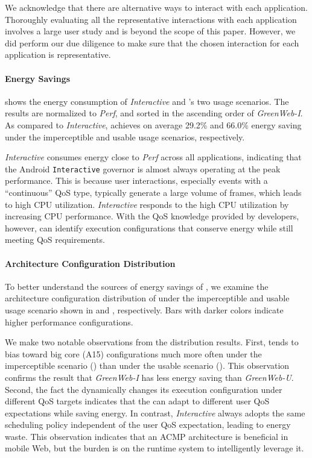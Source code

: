 We acknowledge that there are alternative ways to interact with each application. Thoroughly evaluating all the representative interactions with each application involves a large user study and is beyond the scope of this paper. However, we did perform our due diligence to make sure that the chosen interaction for each application is representative.

\paragraph{Energy Savings}  shows the energy consumption of \textit{Interactive} and \greenweb's two usage scenarios. The results are normalized to \textit{Perf}, and sorted in the ascending order of \textit{GreenWeb-I}. As compared to \textit{Interactive}, \greenweb achieves on average 29.2\% and 66.0\% energy saving under the imperceptible and usable usage scenarios, respectively.

\textit{Interactive} consumes energy close to \textit{Perf} across all applications, indicating that the Android \texttt{Interactive} governor is almost always operating at the peak performance. This is because user interactions, especially events with a ``continuous'' QoS type, typically generate a large volume of frames, which leads to high CPU utilization. \textit{Interactive} responds to the high CPU utilization by increasing CPU performance. With the QoS knowledge provided by developers, however, \greenweb can identify execution configurations that conserve energy while still meeting QoS requirements.

\paragraph{Architecture Configuration Distribution} To better understand the sources of energy savings of \greenweb, we examine the architecture configuration distribution of \greenweb under the imperceptible and usable usage scenario shown in  and , respectively. Bars with darker colors indicate higher performance configurations.

We make two notable observations from the distribution results. First, \greenweb tends to bias toward big core (A15) configurations much more often under the imperceptible scenario () than under the usable scenario (). This observation confirms the result that \textit{GreenWeb-I} has less energy saving than \textit{GreenWeb-U}. Second, the fact the \greenweb dynamically changes its execution configuration under different QoS targets indicates that the \greenweb can adapt to different user QoS expectations while saving energy. In contrast, \textit{Interactive} always adopts the same scheduling policy independent of the user QoS expectation, leading to energy waste. This observation indicates that an ACMP architecture is beneficial in mobile Web, but the burden is on the runtime system to intelligently leverage it.


